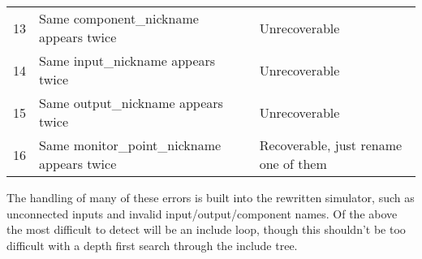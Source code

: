 \documentclass[a4paper]{article}
\begin{document}
\begin{table}[h]
\begin{tabular}{p{0.5cm}p{8cm}p{4cm}}
                13     & Same component\_nickname appears twice                                   & Unrecoverable                                        \\
                14     & Same input\_nickname appears twice                                       & Unrecoverable                                        \\
                15     & Same output\_nickname appears twice                                      & Unrecoverable                                        \\
                16     & Same monitor\_point\_nickname appears twice                              & Recoverable, just rename one of them                 \\ \bottomrule
            \end{tabular}
        \end{table}

        The handling of many of these errors is built into the rewritten simulator, such as unconnected inputs and invalid input/output/component names. Of the above the most difficult to detect will be an include loop, though this shouldn't be too difficult with a depth first search through the include tree.

\null
\vfill


\end{document}
